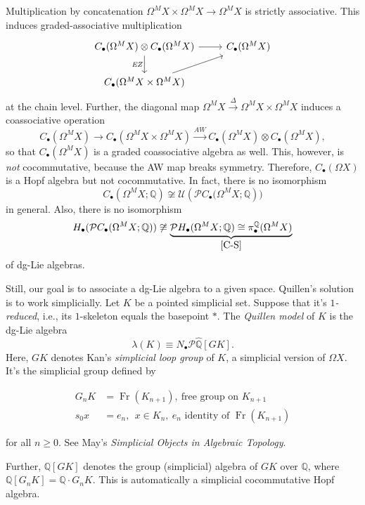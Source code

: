 \documentclass[10pt,letterpaper,cm]{nupset}
\theoremstyle{definition}
\theoremstyle{theorem}
\theoremstyle{remark}
\renewcommand{\P}{\mathcal P}
\newcommand{\Q}{\mathbb Q}
\newcommand{\U}{\mathcal U}
\newcommand{\1}{\mathbb{1}}
\newcommand{\0}{\vec 0}
\DeclareMathOperator{\fr}{Fr}
\begin{document}
Multiplication by concatenation $\Omega^M{X} \times \Omega^M{X} \to \Omega^M{X}$ is strictly associative. This induces graded-associative multiplication 
\[
\begin{tikzcd}
	{C_{\bullet}(\Omega^M{X}) \otimes C_{\bullet}(\Omega^M{X})} & {C_{\bullet}(\Omega^M{X})} \\
	{C_{\bullet}(\Omega^M{X} \times \Omega^M{X})}
	\arrow["{\textit{EZ}}"', from=1-1, to=2-1]
	\arrow[from=2-1, to=1-2]
	\arrow[from=1-1, to=1-2]
\end{tikzcd}
\] at the chain level. Further, the diagonal map $\Omega^M{X} \xrightarrow{\Delta} \Omega^M{X} \times \Omega^M{X}$ induces a coassociative operation
\[
C_{\bullet}(\Omega^M{X}) \to C_{\bullet}(\Omega^M{X} \times \Omega^M{X})  \xrightarrow{\textit{AW}} C_{\bullet}(\Omega^M{X}) \otimes C_{\bullet}(\Omega^M{X})
,\] so that $C_{\bullet}(\Omega^M{X})$ is a graded coassociative algebra as well. This, however, is \emph{not} cocommutative, because the AW map breaks symmetry. Therefore, $C_{\bullet}(\Omega{X})$ is a Hopf algebra but not cocommutative. In fact, there is no isomorphism
\[
C_{\bullet}(\Omega^M{X}; \Q) \not\cong \U(\P{C_{\bullet}(\Omega^M{X}; \Q}))
\] in general. Also, there is no isomorphism 
\[
H_{\bullet}(\P{C_{\bullet}(\Omega^M{X}; \Q)}) \not\cong \underbrace{\P{H_{\bullet}(\Omega^M{X}; \Q)} \cong \pi_{\bullet}^{\Q}(\Omega^M{X})}_{\cref{C-S}}
\] of dg-Lie algebras.

\medskip

Still, our goal is to associate a dg-Lie algebra to a given space. Quillen's solution is to work simplicially. Let $K$ be a pointed simplicial set. Suppose that it's \textit{$1$-reduced}, i.e., its $1$-skeleton equals the basepoint $\ast$.    The  \textit{Quillen model} of $K$ is the dg-Lie algebra
\[
\lambda(K) \equiv N_{\bullet}{\P{\hat{\Q}\left[G{K}\right]}}.
\]
Here, $G{K}$ denotes Kan's \textit{simplicial loop group} of $K$, a simplicial version of $\Omega{X}$. It's the simplicial group defined by

\begin{align*}
G_n{K} & = \fr(K_{n+1}),\  \text{free group on $K_{n+1}$}
\\ s_0{x} & = e_n,\ \  x \in K_n, \ \text{$e_n$ identity of $\fr(K_{n+1})$}  
\end{align*}

for all $n \geq 0$. See May's \textit{Simplicial Objects in Algebraic Topology}. 

\medskip

Further, $\Q\left[G{K}\right]$ denotes the group (simplicial) algebra of $G{K}$ over $\Q$, where $\Q\left[G_n{K}\right] = \Q \cdot G_n{K}$. This is automatically a simplicial cocommutative Hopf algebra.
\end{document}
